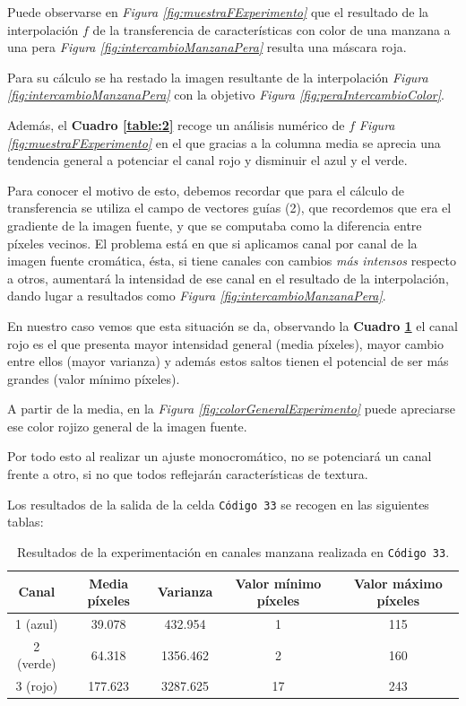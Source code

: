 \documentclass[11pt,twoside,titlepage,a4paper]{article}
\numberwithin{equation}{section} %
\theoremstyle{usual}
\begin{document}
Puede observarse en \textit{Figura \ref{fig:muestraFExperimento}} que el resultado de la interpolación $f$ de la transferencia de características con color de una manzana a una pera \textit{Figura \ref{fig:intercambioManzanaPera}} resulta una máscara roja. 

Para su cálculo se ha restado la imagen resultante de la interpolación \textit{Figura \ref{fig:intercambioManzanaPera}} con la objetivo \textit{Figura \ref{fig:peraIntercambioColor}}. 

Además, el \textbf{Cuadro \ref{table:2}} recoge un análisis numérico de  $f$ \textit{Figura \ref{fig:muestraFExperimento}} en el que gracias a la columna media se aprecia una tendencia general a potenciar el canal rojo y disminuir el azul y el verde. 

Para conocer el motivo de esto, debemos recordar que para el cálculo de transferencia se utiliza el campo de vectores guías (2), que recordemos que era el gradiente de la imagen fuente, y que se computaba como la diferencia entre píxeles vecinos. El problema está en que si aplicamos canal por canal de la  imagen fuente cromática, ésta, si tiene canales con cambios \textit{más intensos} respecto a otros, aumentará la intensidad de ese canal en el resultado de la interpolación, dando lugar a resultados como \textit{Figura \ref{fig:intercambioManzanaPera}}. 

 En nuestro caso vemos que esta situación se da, observando la \textbf{Cuadro \ref{table:1}} el canal rojo es el que presenta mayor intensidad general (media píxeles),  mayor cambio entre ellos (mayor varianza) y además estos saltos tienen el potencial de ser más grandes (valor mínimo píxeles). 

 A partir de la media, en la \textit{Figura \ref{fig:colorGeneralExperimento}} puede apreciarse ese color rojizo general de la imagen fuente. 

Por todo esto al realizar un ajuste monocromático, no se potenciará un canal frente a otro, si no que todos reflejarán características de textura. 

Los resultados de la salida de la celda \texttt{Código 33} se recogen en las siguientes tablas:

\begin{table}[h!]
\centering
\begin{tabular}{|| c ||c c c c||} 
 \hline
 Canal & Media píxeles & Varianza & Valor mínimo píxeles & Valor máximo píxeles \\ [0.5ex] 
 \hline\hline
 1 (azul) & 39.078 & 432.954 & 1 & 115 \\ 
 2 (verde) & 64.318  & 1356.462 & 2 & 160 \\
 3 (rojo) & 177.623 & 3287.625 & 17 & 243 \\ [1ex] 
 \hline
\end{tabular}
\caption{Resultados de la experimentación en canales  manzana realizada en \texttt{Código 33}.}
\label{table:1}
\end{table}
\end{document}
